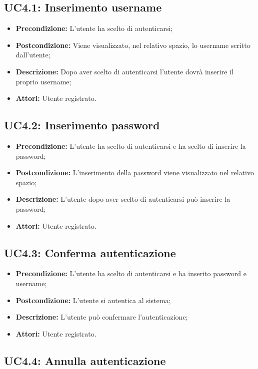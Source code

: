 \subsection{ UC4.1: Inserimento username}

\begin{itemize}
	\item \textbf{Precondizione:} L'utente ha scelto di autenticarsi;
	\item \textbf{Postcondizione:} Viene visualizzato, nel relativo spazio, lo username scritto dall'utente;
	\item \textbf{Descrizione:} Dopo aver scelto di autenticarsi l'utente dovrà inserire il proprio username;
	\item \textbf{Attori:} Utente registrato.
\end{itemize}
\subsection{ UC4.2: Inserimento password}

\begin{itemize}
	\item \textbf{Precondizione:} L'utente ha scelto di autenticarsi e ha scelto di inserire la password;
	\item \textbf{Postcondizione:} L'inserimento della password viene visualizzato nel relativo spazio;
	\item \textbf{Descrizione:} L'utente dopo aver scelto di autenticarsi può inserire la password;
	\item \textbf{Attori:} Utente registrato.
\end{itemize}
\subsection{ UC4.3: Conferma autenticazione}

\begin{itemize}
	\item \textbf{Precondizione:} L'utente ha scelto di autenticarsi e ha inserito password e username;
	\item \textbf{Postcondizione:} L'utente si autentica al sistema;
	\item \textbf{Descrizione:} L'utente può confermare l'autenticazione;
	\item \textbf{Attori:} Utente registrato.
\end{itemize}
\subsection{ UC4.4: Annulla autenticazione}

